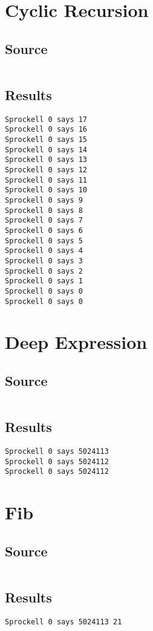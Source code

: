 \documentclass[twoside]{report}
\begin{document}
\section{Cyclic Recursion}
\subsection{Source}
\inputminted[tabsize=4,linenos,firstnumber=1]{text}{../../src/haskell/PP-project-2017/test/cyclic_recursion.shl}
\subsection{Results}
\begin{verbatim}
Sprockell 0 says 17
Sprockell 0 says 16
Sprockell 0 says 15
Sprockell 0 says 14
Sprockell 0 says 13
Sprockell 0 says 12
Sprockell 0 says 11
Sprockell 0 says 10
Sprockell 0 says 9
Sprockell 0 says 8
Sprockell 0 says 7
Sprockell 0 says 6
Sprockell 0 says 5
Sprockell 0 says 4
Sprockell 0 says 3
Sprockell 0 says 2
Sprockell 0 says 1
Sprockell 0 says 0
Sprockell 0 says 0
\end{verbatim}

\section{Deep Expression}
\subsection{Source}
\inputminted[tabsize=4,linenos,firstnumber=1]{text}{../../src/haskell/PP-project-2017/test/deep_expression.shl}
\subsection{Results}
\begin{verbatim}
Sprockell 0 says 5024113
Sprockell 0 says 5024112
Sprockell 0 says 5024112
\end{verbatim}

\section{Fib}
\subsection{Source}
\inputminted[tabsize=4,linenos,firstnumber=1]{text}{../../src/haskell/PP-project-2017/test/fib.shl}
\subsection{Results}
\begin{verbatim}
Sprockell 0 says 5024113 21
\end{verbatim}
\end{document}
